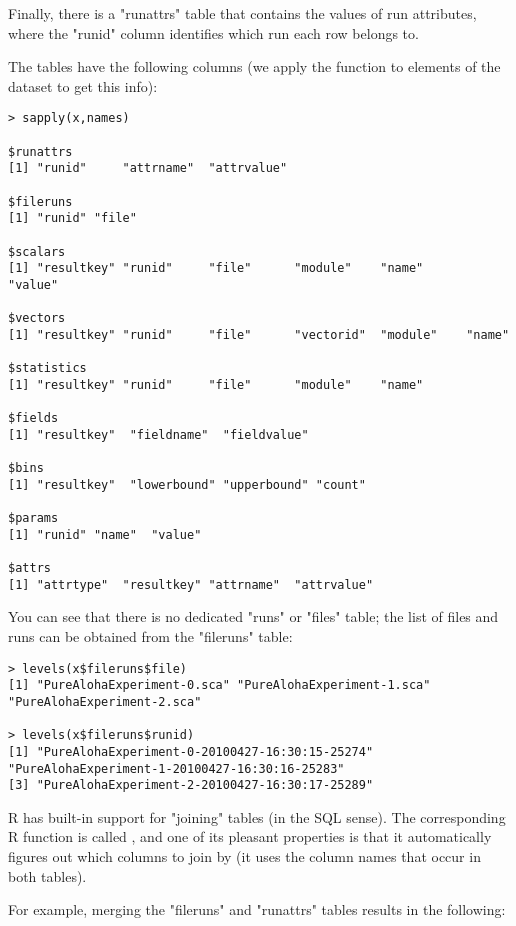 Finally, there is a "runattrs" table that contains the values of run attributes,
where the "runid" column identifies which run each row belongs to.

The tables have the following columns (we apply the  function to
elements of the dataset to get this info):

\begin{verbatim}
> sapply(x,names)

$runattrs
[1] "runid"     "attrname"  "attrvalue"

$fileruns
[1] "runid" "file"

$scalars
[1] "resultkey" "runid"     "file"      "module"    "name"      "value"

$vectors
[1] "resultkey" "runid"     "file"      "vectorid"  "module"    "name"

$statistics
[1] "resultkey" "runid"     "file"      "module"    "name"

$fields
[1] "resultkey"  "fieldname"  "fieldvalue"

$bins
[1] "resultkey"  "lowerbound" "upperbound" "count"

$params
[1] "runid" "name"  "value"

$attrs
[1] "attrtype"  "resultkey" "attrname"  "attrvalue"
\end{verbatim}

You can see that there is no dedicated "runs" or "files" table; the list of
files and runs can be obtained from the "fileruns" table:

\begin{verbatim}
> levels(x$fileruns$file)
[1] "PureAlohaExperiment-0.sca" "PureAlohaExperiment-1.sca" "PureAlohaExperiment-2.sca"

> levels(x$fileruns$runid)
[1] "PureAlohaExperiment-0-20100427-16:30:15-25274" "PureAlohaExperiment-1-20100427-16:30:16-25283"
[3] "PureAlohaExperiment-2-20100427-16:30:17-25289"
\end{verbatim}

R has built-in support for "joining" tables (in the SQL sense). The corresponding
R function is called , and one of its pleasant properties is that it
automatically figures out which columns to join by (it uses the column names that
occur in both tables).

For example, merging the "fileruns" and "runattrs" tables results in the following:

